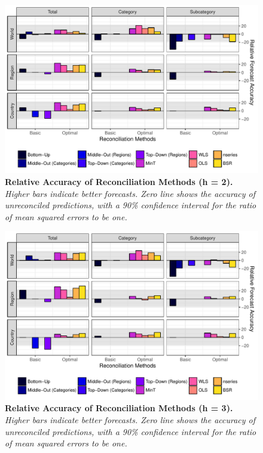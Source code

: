 \begin{figure}[H]
	\includegraphics[width=\textwidth]{fig/fig_eval_rmse_relative_h2}
	\caption[Relative Accuracy of Reconciliation Methods (h = 2)]{\textbf{Relative Accuracy of Reconciliation Methods (h = 2).} \textit{Higher bars indicate better forecasts. Zero line shows the accuracy of unreconciled predictions, with a 90\% confidence interval for the ratio of mean squared errors to be one.}} \label{fig:rmseh2}
\end{figure}
\begin{figure}[H]
	\includegraphics[width=\textwidth]{fig/fig_eval_rmse_relative_h3}
	\caption[Relative Accuracy of Reconciliation Methods (h = 3)]{\textbf{Relative Accuracy of Reconciliation Methods (h = 3).} \textit{Higher bars indicate better forecasts. Zero line shows the accuracy of unreconciled predictions, with a 90\% confidence interval for the ratio of mean squared errors to be one.}} \label{fig:rmseh3}
\end{figure}

